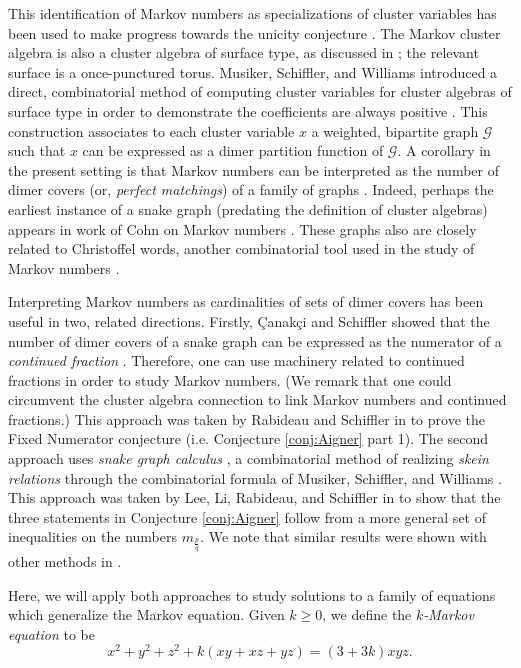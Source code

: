 \documentclass[12pt, letterpaper,table]{amsart}
\theoremstyle{remark}
\newcommand{\fpq}{\frac{p}{q}}
\newcommand{\canakci}{{\c{C}}anak{\c{c}}i }
\begin{document}
This identification of Markov numbers as specializations of cluster variables has been used to make progress towards the unicity conjecture \cite{LLRS,rabideau2020continued}. The Markov cluster algebra is also a cluster algebra of surface type, as discussed in \cite{FST-I,FT-II}; the relevant surface is a once-punctured torus. Musiker, Schiffler, and Williams introduced a direct, combinatorial method of computing cluster variables for cluster algebras of surface type in order to demonstrate the coefficients are always positive \cite{musiker2011positivity}. This construction associates to each cluster variable $x$ a weighted, bipartite graph $\mathcal{G}$ such that $x$ can be expressed as a dimer partition function of $\mathcal{G}$. A corollary in the present setting is that Markov numbers can be interpreted as the number of dimer covers (or, \emph{perfect matchings}) of a family of graphs \cite{propp2005combinatorics}. Indeed, perhaps the earliest instance of a snake graph (predating the definition of cluster algebras) appears in work of Cohn on Markov numbers \cite{Cohn}. These graphs also are closely related to Christoffel words, another combinatorial tool used in the study of Markov numbers \cite{Christoffel}.

Interpreting Markov numbers as cardinalities of sets of dimer covers has been useful in two, related directions. Firstly, \canakci and Schiffler showed that the number of dimer covers of a snake graph can be expressed as the numerator of a \emph{continued fraction} \cite{CSContFrac}. Therefore, one can use machinery related to continued fractions in order to study Markov numbers. (We remark that one could circumvent the cluster algebra connection to link Markov numbers and continued fractions.) This approach was taken by Rabideau and Schiffler in \cite{rabideau2020continued} to prove the Fixed Numerator conjecture (i.e. Conjecture \ref{conj:Aigner} part 1). The second approach uses \emph{snake graph calculus} \cite{CS15,CS13}, a combinatorial method of realizing \emph{skein relations} through the combinatorial formula of Musiker, Schiffler, and Williams \cite{musiker2011positivity}. This approach was taken by Lee, Li, Rabideau, and Schiffler in \cite{LLRS} to show that the three statements in Conjecture \ref{conj:Aigner} follow from a more general set of inequalities on the numbers $m_\fpq$. We note that similar results were shown with other methods in \cite{Gaster,MR4265545,mcshane2021convexity}.  

Here, we will apply both approaches to study  solutions to a family of equations which generalize the Markov equation. Given $k \geq 0$, we define the \emph{$k$-Markov equation} to be  \begin{equation}
x^2 + y^2 + z^2 + k(xy + xz + yz) = (3+3k)xyz.\label{eq:GM_General}
\end{equation}
\end{document}
